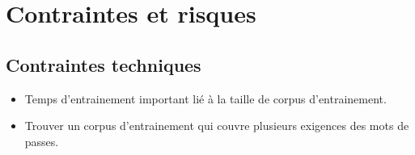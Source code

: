 \section{Contraintes et risques}
\subsection{Contraintes techniques}
\begin{itemize}
    \item Temps d'entrainement important lié à la taille de corpus d'entrainement.
    \item Trouver un corpus d'entrainement qui couvre plusieurs exigences des mots de passes.
\end{itemize}